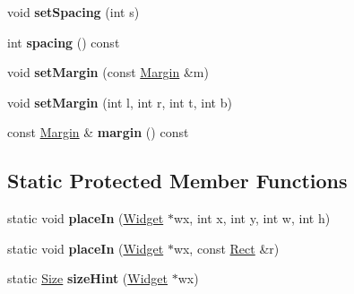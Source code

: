 \begin{DoxyCompactItemize}
\item 
\hypertarget{class_tempest_1_1_layout_af418c6fbe4f82e1a3a14c596cf50b895}{void {\bfseries set\+Spacing} (int s)}\label{class_tempest_1_1_layout_af418c6fbe4f82e1a3a14c596cf50b895}

\item 
\hypertarget{class_tempest_1_1_layout_a5dd98a7f5bd3b4bb2eea2c1e022c9598}{int {\bfseries spacing} () const }\label{class_tempest_1_1_layout_a5dd98a7f5bd3b4bb2eea2c1e022c9598}

\item 
\hypertarget{class_tempest_1_1_layout_a605f2680fb9ddd005805da1d212be1f1}{void {\bfseries set\+Margin} (const \hyperlink{struct_tempest_1_1_margin}{Margin} \&m)}\label{class_tempest_1_1_layout_a605f2680fb9ddd005805da1d212be1f1}

\item 
\hypertarget{class_tempest_1_1_layout_a9ebf5d9fa194a2b13dc2a228ba6126c0}{void {\bfseries set\+Margin} (int l, int r, int t, int b)}\label{class_tempest_1_1_layout_a9ebf5d9fa194a2b13dc2a228ba6126c0}

\item 
\hypertarget{class_tempest_1_1_layout_a1d099fd11854fdfbdbcce0317a8bdc3a}{const \hyperlink{struct_tempest_1_1_margin}{Margin} \& {\bfseries margin} () const }\label{class_tempest_1_1_layout_a1d099fd11854fdfbdbcce0317a8bdc3a}

\end{DoxyCompactItemize}
\subsection*{Static Protected Member Functions}
\begin{DoxyCompactItemize}
\item 
\hypertarget{class_tempest_1_1_layout_a2859f142bec996dcd51100d57cfb3213}{static void {\bfseries place\+In} (\hyperlink{class_tempest_1_1_widget}{Widget} $\ast$wx, int x, int y, int w, int h)}\label{class_tempest_1_1_layout_a2859f142bec996dcd51100d57cfb3213}

\item 
\hypertarget{class_tempest_1_1_layout_a8a6fe7f26e1fe6d8509a2a9c0a1ae438}{static void {\bfseries place\+In} (\hyperlink{class_tempest_1_1_widget}{Widget} $\ast$wx, const \hyperlink{struct_tempest_1_1_rect}{Rect} \&r)}\label{class_tempest_1_1_layout_a8a6fe7f26e1fe6d8509a2a9c0a1ae438}

\item 
\hypertarget{class_tempest_1_1_layout_af03db7399995fda263a98cdc68eee76a}{static \hyperlink{struct_tempest_1_1_size}{Size} {\bfseries size\+Hint} (\hyperlink{class_tempest_1_1_widget}{Widget} $\ast$wx)}\label{class_tempest_1_1_layout_af03db7399995fda263a98cdc68eee76a}

\end{DoxyCompactItemize}
